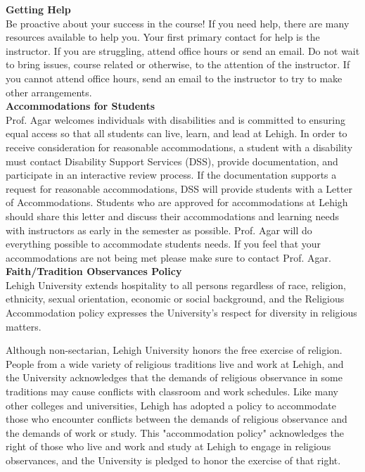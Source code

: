 \documentclass[11pt,letterpaper]{article}
\newcommand{\lefthead}[2]{\noindent\textbf{#1}\hfill\\[#2]}
\begin{document}
\lefthead{Getting Help}{0.3cm}
\noindent Be proactive about your success in the course!  If you need help, there are many resources available to help you. Your first primary contact for help is the instructor. If you are struggling, attend office hours or send an email. Do not wait to bring issues, course related or otherwise, to the attention of the instructor. If you cannot attend office hours, send an email to the instructor to try to make other arrangements.\\[0.3cm]

\lefthead{Accommodations for Students}{0.3cm}
\noindent Prof. Agar welcomes individuals with disabilities and is committed to ensuring equal access so that all students can live, learn, and lead at Lehigh.
In order to receive consideration for reasonable accommodations, a student with a disability must contact Disability Support Services (DSS), provide documentation, and participate in an interactive review process.  
If the documentation supports a request for reasonable accommodations, DSS will provide students with a Letter of Accommodations. 
Students who are approved for accommodations at Lehigh should share this letter and discuss their accommodations and learning needs with instructors as early in the semester as possible.
Prof. Agar will do everything possible to accommodate students needs.
If you feel that your accommodations are not being met please make sure to contact Prof. Agar.  \\[0.3cm]

\lefthead{Faith/Tradition Observances Policy}{0.3cm}
\noindent Lehigh University extends hospitality to all persons regardless of race, religion, ethnicity, sexual orientation, economic or social background, and the Religious Accommodation policy expresses the University’s respect for diversity in religious matters.

Although non-sectarian, Lehigh University honors the free exercise of religion. People from a wide variety of religious traditions live and work at Lehigh, and the University acknowledges that the demands of religious observance in some traditions may cause conflicts with classroom and work schedules. Like many other colleges and universities, Lehigh has adopted a policy to accommodate those who encounter conflicts between the demands of religious observance and the demands of work or study. This "accommodation policy" acknowledges the right of those who live and work and study at Lehigh to engage in religious observances, and the University is pledged to honor the exercise of that right.
\end{document}
